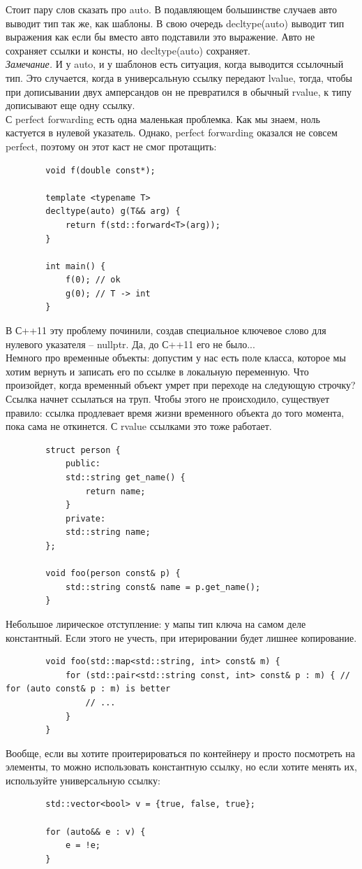 \documentclass[12pt, a4paper]{article}
\begin{document}
	Стоит пару слов сказать про auto. В подавляющем большинстве случаев авто выводит тип так же, как шаблоны. В свою очередь decltype(auto) выводит тип выражения как если бы вместо авто подставили это выражение. Авто не сохраняет ссылки и консты, но decltype(auto) сохраняет.\\
	\textit{Замечание.} И у auto, и у шаблонов есть ситуация, когда выводится ссылочный тип. Это случается, когда в универсальную ссылку передают lvalue, тогда, чтобы при дописывании двух амперсандов он не превратился в обычный rvalue, к типу дописывают еще одну ссылку.
	\\С perfect forwarding есть одна маленькая проблемка. Как мы знаем, ноль кастуется в нулевой указатель. Однако, perfect forwarding оказался не совсем perfect, поэтому он этот каст не смог протащить:
	\begin{verbatim}
		void f(double const*);
		
		template <typename T>
		decltype(auto) g(T&& arg) {
			return f(std::forward<T>(arg));
		}
		
		int main() {
			f(0); // ok
			g(0); // T -> int
		}
	\end{verbatim}
	В С++11 эту проблему починили, создав специальное ключевое слово для нулевого указателя -- nullptr. Да, до С++11 его не было...\\
	Немного про временные объекты: допустим у нас есть поле класса, которое мы хотим вернуть и записать его по ссылке в локальную переменную. Что произойдет, когда временный объект умрет при переходе на следующую строчку? Ссылка начнет ссылаться на труп. Чтобы этого не происходило, существует правило: ссылка продлевает время жизни временного объекта до того момента, пока сама не откинется. С rvalue ссылками это тоже работает.
	\begin{verbatim}
		struct person {
			public:
			std::string get_name() {
				return name;
			}
			private:
			std::string name;
		};
		
		void foo(person const& p) {
			std::string const& name = p.get_name();
		}
	\end{verbatim}
	Небольшое лирическое отступление: у мапы тип ключа на самом деле константный. Если этого не учесть, при итерировании будет лишнее копирование.
	\begin{verbatim}
		void foo(std::map<std::string, int> const& m) {
			for (std::pair<std::string const, int> const& p : m) { // for (auto const& p : m) is better
				// ...
			}
		}
	\end{verbatim}
	Вообще, если вы хотите проитерироваться по контейнеру и просто посмотреть на элементы, то можно использовать константную ссылку, но если хотите менять их, используйте универсальную ссылку:
	\begin{verbatim}
		std::vector<bool> v = {true, false, true};
		
		for (auto&& e : v) {
			e = !e;
		}
	\end{verbatim}
\end{document}
